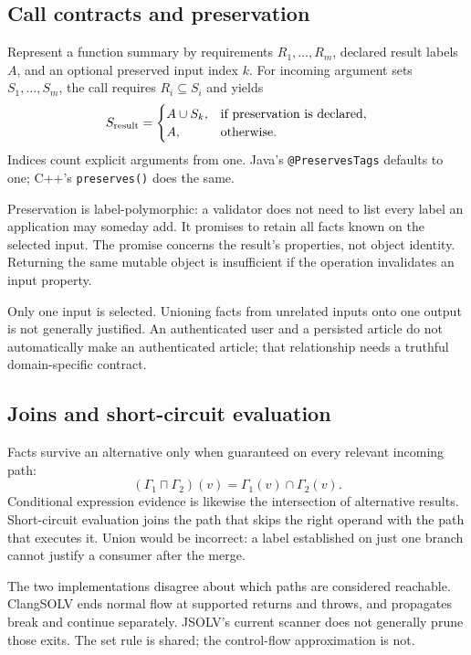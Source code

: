 \documentclass[11pt]{article}
\newcommand{\env}{\Gamma}
\begin{document}
\subsection{Call contracts and preservation}
Represent a function summary by requirements $R_1,\ldots,R_m$, declared
result labels $A$, and an optional preserved input index $k$. For incoming
argument sets $S_1,\ldots,S_m$, the call requires $R_i\subseteq S_i$ and yields
\[
 S_{\rm result}=
 \begin{cases}
 A\cup S_k,&\text{if preservation is declared},\\
 A,&\text{otherwise}.
 \end{cases}
\]
Indices count explicit arguments from one. Java's \texttt{@PreservesTags}
defaults to one; C++'s \texttt{preserves()} does the same.

Preservation is label-polymorphic: a validator does not need to list every
label an application may someday add. It promises to retain all facts known
on the selected input. The promise concerns the result's properties, not
object identity. Returning the same mutable object is insufficient if the
operation invalidates an input property.

Only one input is selected. Unioning facts from unrelated inputs onto one
output is not generally justified. An authenticated user and a persisted
article do not automatically make an authenticated article; that relationship
needs a truthful domain-specific contract.

\subsection{Joins and short-circuit evaluation}
Facts survive an alternative only when guaranteed on every relevant incoming
path:
\[
 (\env_1\sqcap\env_2)(v)=\env_1(v)\cap\env_2(v).
\]
Conditional expression evidence is likewise the intersection of alternative
results. Short-circuit evaluation joins the path that skips the right operand
with the path that executes it. Union would be incorrect: a label established
on just one branch cannot justify a consumer after the merge.

The two implementations disagree about which paths are considered reachable.
ClangSOLV ends normal flow at supported returns and throws, and propagates
break and continue separately. JSOLV's current scanner does not generally
prune those exits. The set rule is shared; the control-flow approximation is not.
\end{document}
